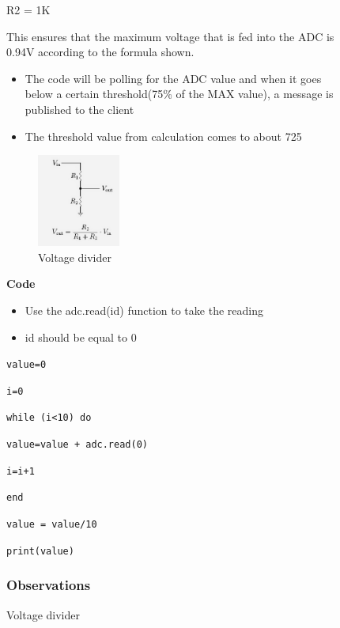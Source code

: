 \documentclass[16pt]{article}
\begin{document}
\begin{figure}
R2 = 1K

This ensures that the maximum voltage that is fed into the ADC is 0.94V
according to the formula shown.



\begin{itemize}

\item
  The code will be polling for the ADC value and when it goes below a
  certain threshold(75\% of the MAX value), a message is published to
  the client
\item
  The threshold value from calculation comes to about 725
\end{itemize}


\begin{figure}
\hspace{3.5cm}
\includegraphics[width=0.3\textwidth]{images/divider.jpeg}
\caption{Voltage divider}
\end{figure}


\textbf{Code}

\begin{itemize}

\item
  Use the adc.read(id) function to take the reading
\item
  id should be equal to 0
\end{itemize}

\texttt{value=0}

\texttt{i=0}

\texttt{while (i\textless{}10) do}

\texttt{value=value + adc.read(0)}

\texttt{i=i+1}

\texttt{end}

\texttt{value = value/10}

\texttt{print(value)}



\subsubsection{Observations}


\end{figure}
\end{document}

